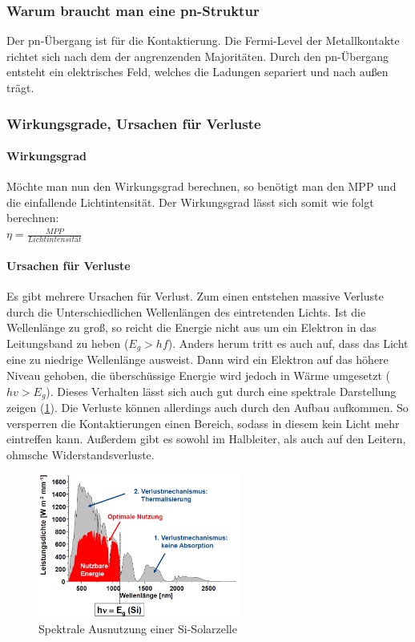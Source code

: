 	\subsubsection{Warum braucht man eine pn-Struktur}

		Der pn-Übergang ist für die Kontaktierung. Die Fermi-Level der Metallkontakte richtet sich nach dem der angrenzenden Majoritäten. Durch den pn-Übergang entsteht ein elektrisches Feld, welches die Ladungen separiert und nach außen trägt. 

	\subsubsection{Wirkungsgrade, Ursachen für Verluste}
	
		\paragraph{Wirkungsgrad} Möchte man nun den Wirkungsgrad berechnen, so benötigt man den MPP und die einfallende Lichtintensität. Der Wirkungsgrad lässt sich somit wie folgt berechnen:\\
		$\eta = \frac{MPP}{Lichtintensität}$
		
		\paragraph{Ursachen für Verluste} Es gibt mehrere Ursachen für Verlust. Zum einen entstehen massive Verluste durch die Unterschiedlichen Wellenlängen des eintretenden Lichts. Ist die Wellenlänge zu groß, so reicht die Energie nicht aus um ein Elektron in das Leitungsband zu heben ($E_g>hf$). Anders herum tritt es auch auf, dass das Licht eine zu niedrige Wellenlänge ausweist. Dann wird ein Elektron auf das höhere Niveau gehoben, die überschüssige Energie wird jedoch in Wärme umgesetzt ($hv > E_g$). Dieses Verhalten lässt sich auch gut durch eine spektrale Darstellung zeigen (\ref{9_spektrum}). Die Verluste können allerdings auch durch den Aufbau aufkommen. So versperren die Kontaktierungen einen Bereich, sodass in diesem kein Licht mehr eintreffen kann. Außerdem gibt es sowohl im Halbleiter, als auch auf den Leitern, ohmsche Widerstandsverluste.
		
		\begin{figure}[h]
			\centering
			\includegraphics[width=0.6\textwidth]{Kapitel/Kap09/spektrum.png}
			\caption{Spektrale Ausnutzung einer Si-Solarzelle}
			\label{9_spektrum}
		\end{figure}
	

